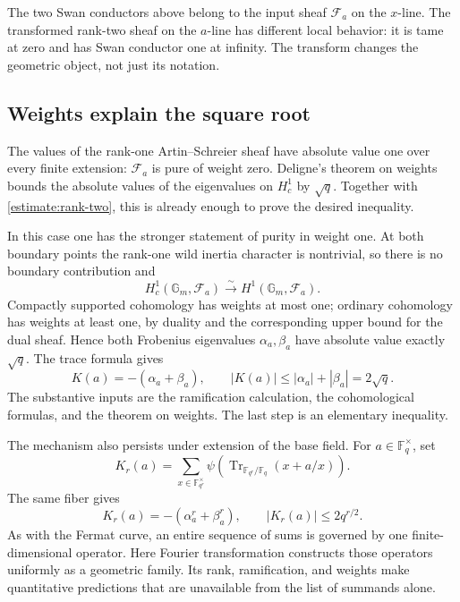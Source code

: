 \documentclass[11pt]{article}
\theoremstyle{remark}
\begin{document}
The two Swan conductors above belong to the input sheaf \(\mathcal F_a\) on the \(x\)-line. The transformed rank-two sheaf on the \(a\)-line has different local behavior: it is tame at zero and has Swan conductor one at infinity. The transform changes the geometric object, not just its notation.

\subsection{Weights explain the square root}

The values of the rank-one Artin--Schreier sheaf have absolute value one over every finite extension: \(\mathcal F_a\) is pure of weight zero. Deligne's theorem on weights bounds the absolute values of the eigenvalues on \(H_c^1\) by \(\sqrt q\). Together with \eqref{estimate:rank-two}, this is already enough to prove the desired inequality.

In this case one has the stronger statement of purity in weight one. At both boundary points the rank-one wild inertia character is nontrivial, so there is no boundary contribution and
\[
H_c^1(\mathbb G_m,\mathcal F_a)
\overset{\sim}{\longrightarrow}
H^1(\mathbb G_m,\mathcal F_a).
\]
Compactly supported cohomology has weights at most one; ordinary cohomology has weights at least one, by duality and the corresponding upper bound for the dual sheaf. Hence both Frobenius eigenvalues \(\alpha_a,\beta_a\) have absolute value exactly \(\sqrt q\). The trace formula gives
\[
K(a)=-(\alpha_a+\beta_a),\qquad
|K(a)|\le|\alpha_a|+|\beta_a|=2\sqrt q.
\]
The substantive inputs are the ramification calculation, the cohomological formulas, and the theorem on weights. The last step is an elementary inequality.

The mechanism also persists under extension of the base field. For \(a\in\mathbb F_q^\times\), set
\[
K_r(a)=\sum_{x\in\mathbb F_{q^r}^\times}
\psi\!\left(\operatorname{Tr}_{\mathbb F_{q^r}/\mathbb F_q}
(x+a/x)\right).
\]
The same fiber gives
\begin{equation}
K_r(a)=-(\alpha_a^r+\beta_a^r),\qquad
|K_r(a)|\le2q^{r/2}.
\label{estimate:extensions}
\end{equation}
As with the Fermat curve, an entire sequence of sums is governed by one finite-dimensional operator. Here Fourier transformation constructs those operators uniformly as a geometric family. Its rank, ramification, and weights make quantitative predictions that are unavailable from the list of summands alone.
\end{document}
